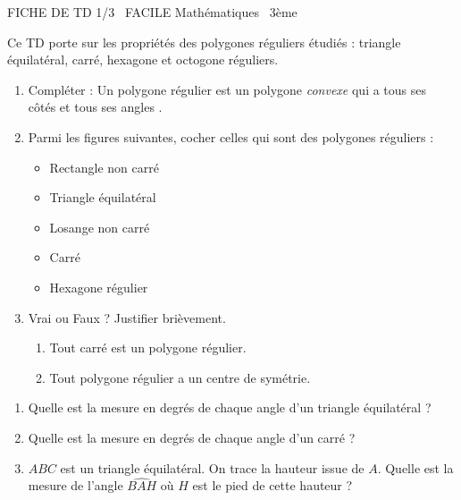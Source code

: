 \documentclass[11pt]{article}
\begin{document}
\begin{tcolorbox}[enhanced,colback=popink,colframe=popink,arc=10pt,boxrule=0pt,left=12pt,right=12pt,top=9pt,bottom=9pt]
{\color{white}\popxbold\small FICHE DE TD 1/3 \textbullet\ FACILE \hfill Mathématiques \textbullet\ 3ème\par}
\end{tcolorbox}
\vspace{4pt}
Ce TD porte sur les propriétés des polygones réguliers étudiés : triangle équilatéral, carré, hexagone et octogone réguliers.

\begin{exercice}
\begin{enumerate}
    \item Compléter : Un polygone régulier est un polygone \textit{convexe} qui a tous ses côtés \underline{\hspace{3cm}} et tous ses angles \underline{\hspace{3cm}}.
    \item Parmi les figures suivantes, cocher celles qui sont des polygones réguliers :
    \begin{itemize}
        \item Rectangle non carré
        \item Triangle équilatéral
        \item Losange non carré
        \item Carré
        \item Hexagone régulier
    \end{itemize}
    \item Vrai ou Faux ? Justifier brièvement.
    \begin{enumerate}
        \item Tout carré est un polygone régulier.
        \item Tout polygone régulier a un centre de symétrie.
    \end{enumerate}
\end{enumerate}
\end{exercice}

\begin{exercice}
\begin{enumerate}
    \item Quelle est la mesure en degrés de chaque angle d'un triangle équilatéral ?
    \item Quelle est la mesure en degrés de chaque angle d'un carré ?
    \item $ABC$ est un triangle équilatéral. On trace la hauteur issue de $A$. Quelle est la mesure de l'angle $\widehat{BAH}$ où $H$ est le pied de cette hauteur ?
\end{enumerate}
\end{exercice}
\end{document}
